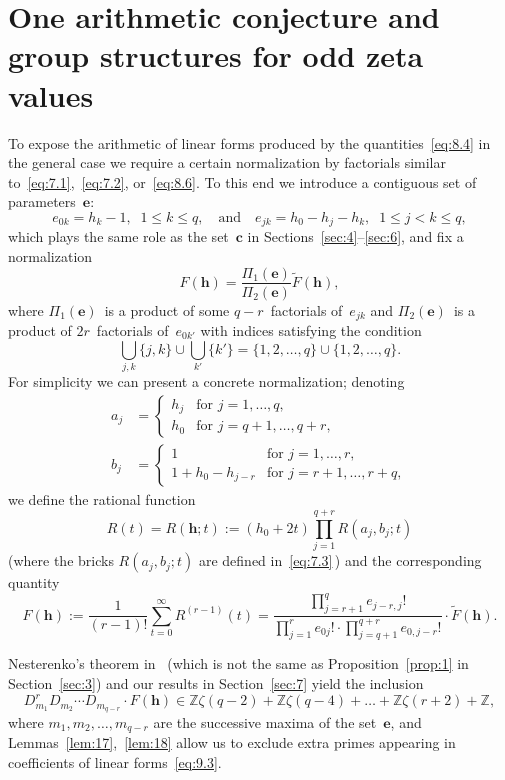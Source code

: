 \documentclass[a4paper,twoside]{article}
\numberwithin{equation}{section}
\renewcommand{\[}{\lfloor}
\renewcommand{\]}{\rfloor}
\newcommand{\<}{\langle}
\renewcommand{\>}{\rangle}
\newcommand{\wt}{\widetilde}
\newcommand{\bc}{\boldsymbol c}
\newcommand{\be}{\boldsymbol e}
\newcommand{\bh}{\boldsymbol h}
\begin{document}
\section{One arithmetic conjecture and\\
group structures for odd zeta values}
\label{sec:9}
To expose the arithmetic of linear forms produced
by the quantities~\eqref{eq:8.4} in the general case
we require a certain normalization
by factorials similar to~\eqref{eq:7.1},~\eqref{eq:7.2}, or~\eqref{eq:8.6}.
To this end we introduce a contiguous set of parameters~$\be$:
\begin{equation}
e_{0k}=h_k-1, \;\; 1\le k\le q,
\quad\mbox{and}\quad
e_{jk}=h_0-h_j-h_k, \;\; 1\le j<k\le q,
\label{eq:9.1}
\end{equation}
which plays the same role as the set~$\bc$
in Sections~\ref{sec:4}--\ref{sec:6},
and fix a normalization
$$
F(\bh)=\frac{\varPi_1(\be)}{\varPi_2(\be)}\wt F(\bh),
$$
where $\varPi_1(\be)$~is a product of some $q-r$~factorials of~$e_{jk}$
and $\varPi_2(\be)$~is a product of $2r$~factorials of~$e_{0k'}$
with indices satisfying the condition
$$
\bigcup_{j,k}\{j,k\}\cup\bigcup_{k'}\{k'\}
=\{1,2,\dots,q\}\cup\{1,2,\dots,q\}.
$$
For simplicity we can present a concrete normalization;
denoting
$$
\begin{aligned}
a_j&=\begin{cases}
h_j &\mbox{for $j=1,\dots,q$}, \\
h_0 &\mbox{for $j=q+1,\dots,q+r$},
\end{cases}
\\
b_j&=\begin{cases}
1 &\mbox{for $j=1,\dots,r$}, \\
1+h_0-h_{j-r} &\mbox{for $j=r+1,\dots,r+q$},
\end{cases}
\end{aligned}
$$
we define the rational function
$$
R(t)=R(\bh;t)
:=(h_0+2t)\prod_{j=1}^{q+r}R(a_j,b_j;t)
$$
(where the bricks $R(a_j,b_j;t)$ are defined in~\eqref{eq:7.3}\,)
and the corresponding quantity
\begin{equation}
F(\bh)
:=\frac1{(r-1)!}\sum_{t=0}^\infty R^{(r-1)}(t)
=\frac{\prod_{j=r+1}^qe_{j-r,j}!}
{\prod_{j=1}^re_{0j}!\cdot\prod_{j=q+1}^{q+r}e_{0,j-r}!}
\cdot\wt F(\bh).
\label{eq:9.2}
\end{equation}

Nesterenko's theorem in~\cite{Ne3} (which is not the same as
Proposition~\ref{prop:1} in Section~\ref{sec:3})
and our results in Section~\ref{sec:7}
yield the inclusion
\begin{equation}
D_{m_1}^rD_{m_2}\dotsb D_{m_{q-r}}
\cdot F(\bh)\in\mathbb Z\zeta(q-2)
+\mathbb Z\zeta(q-4)+\dots
+\mathbb Z\zeta(r+2)+\mathbb Z,
\label{eq:9.3}
\end{equation}
where $m_1,m_2,\dots,m_{q-r}$ are the successive maxima
of the set~$\be$, and Lemmas~\ref{lem:17},~\ref{lem:18} allow us to exclude
extra primes appearing in coefficients of linear forms~\eqref{eq:9.3}.
\end{document}
